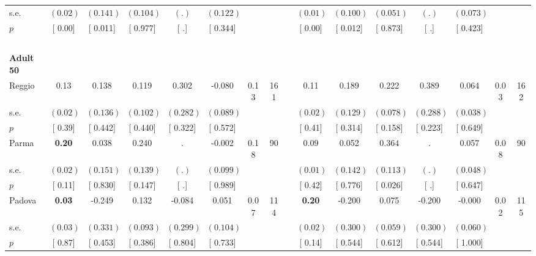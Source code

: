 \begin{longtable}{L{8em} c c c c c c c p{1em} c c c c c c c}
\quad \quad \quad \quad s.e.& $ (     0.02)$ & $ (    0.141)$ & $ (    0.104)$ & $ (        .)$ & $ (    0.122)$ & & & & $ (     0.01)$ & $ (    0.100)$ & $ (    0.051)$ & $ (        .)$ & $ (    0.073)$ & &  \\*
\quad \quad \quad \quad $ p$ & [     0.00] & [    0.011] & [    0.977] & [        .] & [    0.344] & & & & [     0.00] & [    0.012] & [    0.873] & [        .] & [    0.423] & &  \\[1em]
~\\[1em]
\quad \quad \textbf{Adult 50} & & & & & & & & & & & & & & & \\* 
\quad \quad \quad Reggio& 0.13 &     0.138 &     0.119 &     0.302 &    -0.080 &      0.13 &       161 & & 0.11 &     0.189 &     0.222 &     0.389 &     0.064 &      0.03 &       162  \\*
\quad \quad \quad \quad s.e.& $ (     0.02)$ & $ (    0.136)$ & $ (    0.102)$ & $ (    0.282)$ & $ (    0.089)$ & & & & $ (     0.02)$ & $ (    0.129)$ & $ (    0.078)$ & $ (    0.288)$ & $ (    0.038)$ & &  \\*
\quad \quad \quad \quad $ p$ & [     0.39] & [    0.442] & [    0.440] & [    0.322] & [    0.572] & & & & [     0.41] & [    0.314] & [    0.158] & [    0.223] & [    0.649] & &  \\[1em]
\quad \quad \quad Parma& \textbf{     0.20} &     0.038 &     0.240 &         . &    -0.002 &      0.18 &        90 & & 0.09 &     0.052 & $ \mathbf{    0.364}$ &         . &     0.057 &      0.08 &        90  \\*
\quad \quad \quad \quad s.e.& $ (     0.02)$ & $ (    0.151)$ & $ (    0.139)$ & $ (        .)$ & $ (    0.099)$ & & & & $ (     0.01)$ & $ (    0.142)$ & $ (    0.113)$ & $ (        .)$ & $ (    0.048)$ & &  \\*
\quad \quad \quad \quad $ p$ & [     0.11] & [    0.830] & [    0.147] & [        .] & [    0.989] & & & & [     0.42] & [    0.776] & [    0.026] & [        .] & [    0.647] & &  \\[1em]
\quad \quad \quad Padova& \textbf{     0.03} &    -0.249 &     0.132 &    -0.084 &     0.051 &      0.07 &       114 & & \textbf{     0.20} &    -0.200 &     0.075 &    -0.200 &    -0.000 &      0.02 &       115  \\*
\quad \quad \quad \quad s.e.& $ (     0.03)$ & $ (    0.331)$ & $ (    0.093)$ & $ (    0.299)$ & $ (    0.104)$ & & & & $ (     0.02)$ & $ (    0.300)$ & $ (    0.059)$ & $ (    0.300)$ & $ (    0.060)$ & &  \\*
\quad \quad \quad \quad $ p$ & [     0.87] & [    0.453] & [    0.386] & [    0.804] & [    0.733] & & & & [     0.14] & [    0.544] & [    0.612] & [    0.544] & [    1.000] & &  \\[1em]

\end{longtable}
